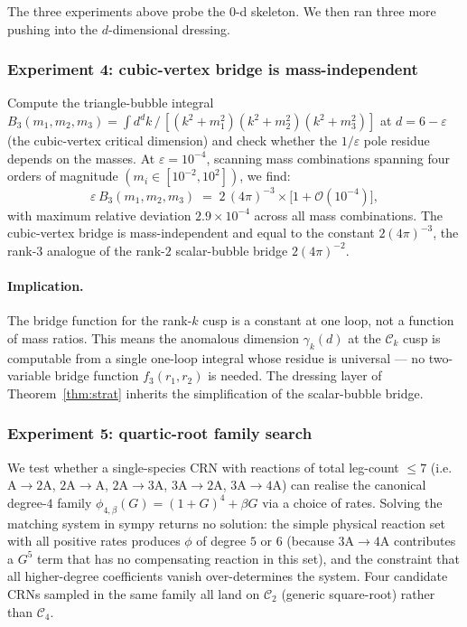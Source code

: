 \documentclass[11pt,a4paper]{article}
\theoremstyle{plain}
\theoremstyle{definition}
\begin{document}
The three experiments above probe the $0$-d skeleton.  We then
ran three more pushing into the $d$-dimensional dressing.

\subsubsection*{Experiment 4: cubic-vertex bridge is mass-independent}

Compute the triangle-bubble integral
$B_{3}(m_{1},m_{2},m_{3}) = \int d^{d}k\,/\,[(k^{2}+m_{1}^{2})(k^{2}+m_{2}^{2})(k^{2}+m_{3}^{2})]$
at $d = 6 - \varepsilon$ (the cubic-vertex critical dimension)
and check whether the $1/\varepsilon$ pole residue depends on
the masses.  At $\varepsilon = 10^{-4}$, scanning mass
combinations spanning four orders of magnitude
$(m_{i}\in [10^{-2}, 10^{2}])$, we find:
\begin{equation}
  \varepsilon\,B_{3}(m_{1},m_{2},m_{3})
  \;=\;
  2\,(4\pi)^{-3} \times \bigl[ 1 + \mathcal{O}(10^{-4}) \bigr],
  \label{eq:rank3bridge}
\end{equation}
with maximum relative deviation $2.9\times 10^{-4}$ across all
mass combinations.  The cubic-vertex bridge is mass-independent
and equal to the constant $2(4\pi)^{-3}$, the rank-$3$ analogue
of the rank-$2$ scalar-bubble bridge $2(4\pi)^{-2}$.

\paragraph{Implication.}
The bridge function for the rank-$k$ cusp is a constant at one
loop, not a function of mass ratios.  This means the anomalous
dimension $\gamma_{k}(d)$ at the $\mathcal{C}_{k}$ cusp is
computable from a single one-loop integral whose residue is
universal --- no two-variable bridge function $f_{3}(r_{1}, r_{2})$
is needed.  The dressing layer of Theorem~\ref{thm:strat}
inherits the simplification of the scalar-bubble bridge.

\subsubsection*{Experiment 5: quartic-root family search}

We test whether a single-species CRN with reactions of total
leg-count $\leq 7$ (i.e.\ $\mathrm{A}\to 2\mathrm{A}$,
$2\mathrm{A}\to\mathrm{A}$, $2\mathrm{A}\to 3\mathrm{A}$,
$3\mathrm{A}\to 2\mathrm{A}$, $3\mathrm{A}\to 4\mathrm{A}$) can
realise the canonical degree-$4$ family
$\phi_{4,\beta}(G)=(1+G)^{4}+\beta G$ via a choice of rates.
Solving the matching system in sympy returns no solution: the
simple physical reaction set with all positive rates produces
$\phi$ of degree $5$ or $6$ (because $3\mathrm{A}\to 4\mathrm{A}$
contributes a $G^{5}$ term that has no compensating reaction in
this set), and the constraint that all higher-degree
coefficients vanish over-determines the system.  Four candidate
CRNs sampled in the same family all land on $\mathcal{C}_{2}$
(generic square-root) rather than $\mathcal{C}_{4}$.
\end{document}
